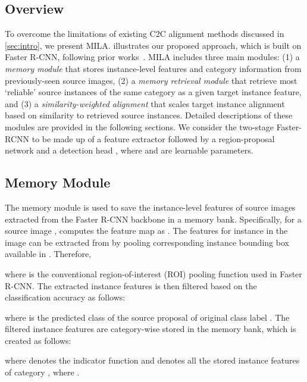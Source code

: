 \documentclass{bmvc2k}
\begin{document}
\subsection{Overview}\label{sec:overview}



To overcome the limitations of existing C2C alignment methods discussed in \cref{sec:intro}, we present MILA.  illustrates our proposed approach, which is built on Faster R-CNN, following prior works~\cite{saito2019strong, xu2020cross, li2022cross}. MILA includes three main modules: (1) a \textit{memory module} that stores instance-level features and category information from previously-seen source images, (2) a \textit{memory retrieval module} that retrieve most `reliable' source instances of the same category as a given target instance feature,
and (3) a \textit{similarity-weighted alignment} that scales target instance alignment based on similarity to retrieved source instances. Detailed descriptions of these modules are provided in the following sections.
We consider the two-stage Faster-RCNN to be made up of a feature extractor  followed by a region-proposal network  and a detection head , where  and  are learnable parameters. 


\subsection{Memory Module}\label{sec:memory module}
The memory module is used to save the instance-level features of source images extracted from the Faster R-CNN backbone in a memory bank. Specifically, for a source image ,  computes the feature map as . 
The features for  instance in the image can be extracted from  by pooling corresponding instance bounding box  available in . Therefore,

where  is the conventional region-of-interest (ROI) pooling function used in Faster R-CNN. The extracted instance features  is then filtered based on the classification accuracy as follows:


where  is the predicted class of the source proposal  of original class label .
The filtered instance features  are category-wise stored in the memory bank, which is created as follows:

where  denotes the indicator function and  denotes all the stored instance features of category , where .
\end{document}
